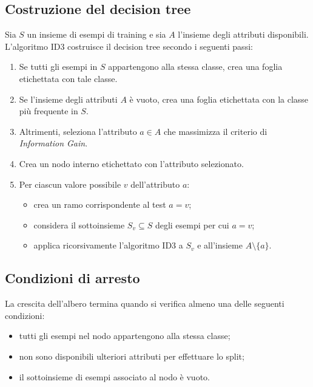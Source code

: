 \documentclass[a4paper,12pt]{report}
\begin{document}
\subsection{Costruzione del decision tree}

Sia \( S \) un insieme di esempi di training e sia \( A \) l’insieme degli attributi disponibili.
L’algoritmo ID3 costruisce il decision tree secondo i seguenti passi:

\begin{enumerate}
    \item Se tutti gli esempi in \( S \) appartengono alla stessa classe, crea una foglia etichettata con tale classe.
    
    \item Se l’insieme degli attributi \( A \) è vuoto, crea una foglia etichettata con la classe più frequente in \( S \).
    
    \item Altrimenti, seleziona l’attributo \( a \in A \) che massimizza il criterio di \textit{Information Gain}.
    
    \item Crea un nodo interno etichettato con l’attributo selezionato.
    
    \item Per ciascun valore possibile \( v \) dell’attributo \( a \):
    \begin{itemize}
        \item crea un ramo corrispondente al test \( a = v \);
        \item considera il sottoinsieme \( S_v \subseteq S \) degli esempi per cui \( a = v \);
        \item applica ricorsivamente l’algoritmo ID3 a \( S_v \) e all’insieme \( A \setminus \{a\} \).
    \end{itemize}
\end{enumerate}

\subsection*{Condizioni di arresto}

La crescita dell’albero termina quando si verifica almeno una delle seguenti condizioni:
\begin{itemize}
    \item tutti gli esempi nel nodo appartengono alla stessa classe;
    \item non sono disponibili ulteriori attributi per effettuare lo split;
    \item il sottoinsieme di esempi associato al nodo è vuoto.
\end{itemize}
\end{document}
